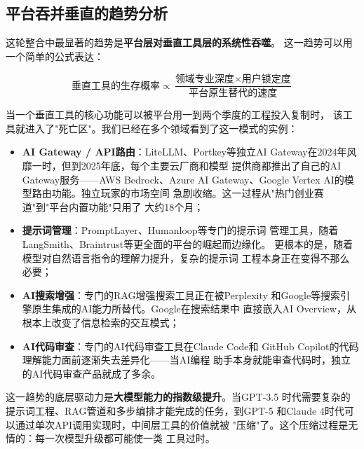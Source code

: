 \subsection{平台吞并垂直的趋势分析}
\label{subsec:outlook-platform-absorbs-vertical}

这轮整合中最显著的趋势是\textbf{平台层对垂直工具层的系统性吞噬}。
这一趋势可以用一个简单的公式表达：

\[
\text{垂直工具的生存概率} \propto \frac{\text{领域专业深度} \times
  \text{用户锁定度}}{\text{平台原生替代的速度}}
\]

当一个垂直工具的核心功能可以被平台用一到两个季度的工程投入复制时，
该工具就进入了"死亡区"。我们已经在多个领域看到了这一模式的实例：

\begin{itemize}
  \item \textbf{AI Gateway / API路由}：LiteLLM、Portkey等独立AI
    Gateway在2024年风靡一时，但到2025年底，每个主要云厂商和模型
    提供商都推出了自己的AI Gateway服务——AWS Bedrock、Azure AI
    Gateway、Google Vertex AI的模型路由功能。独立玩家的市场空间
    急剧收缩。这一过程从"热门创业赛道"到"平台内置功能"只用了
    大约18个月；
  \item \textbf{提示词管理}：PromptLayer、Humanloop等专门的提示词
    管理工具，随着LangSmith、Braintrust等更全面的平台的崛起而边缘化。
    更根本的是，随着模型对自然语言指令的理解力提升，复杂的提示词
    工程本身正在变得不那么必要；
  \item \textbf{AI搜索增强}：专门的RAG增强搜索工具正在被Perplexity
    和Google等搜索引擎原生集成的AI能力所替代。Google在搜索结果中
    直接嵌入AI Overview，从根本上改变了信息检索的交互模式；
  \item \textbf{AI代码审查}：专门的AI代码审查工具在Claude Code和
    GitHub Copilot的代码理解能力面前逐渐失去差异化——当AI编程
    助手本身就能审查代码时，独立的AI代码审查产品就成了多余。
\end{itemize}

这一趋势的底层驱动力是\textbf{大模型能力的指数级提升}。当GPT-3.5
时代需要复杂的提示词工程、RAG管道和多步编排才能完成的任务，到GPT-5
和Claude 4时代可以通过单次API调用实现时，中间层工具的价值就被
"压缩"了。这个压缩过程是无情的：每一次模型升级都可能使一类
工具过时。

